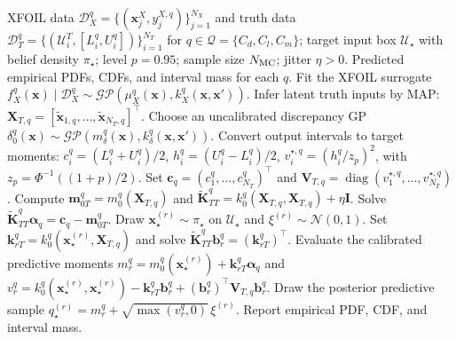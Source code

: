 \documentclass[journal]{new-aiaa}
\begin{document}
\begin{algorithm}[t]
\footnotesize
\caption{Latent input distributional calibration and Monte Carlo propagation}
\label{alg:latent_dc_mc}
\begin{algorithmic}[1]
\Require XFOIL data $\mathcal{D}_X^q= \{ ( \mathbf{x}_{j}^{X},y_{j}^{X,q} ) \}_{j=1}^{N_X}$ and truth data
$\mathcal{D}_T^q=\{(\mathcal{U}_i^T,[L_i^q,U_i^q])\}_{i=1}^{N_T}$ for
$q\in\mathcal{Q}=\{C_d,C_l,C_m\}$; target input box $\mathcal{U}_\star$ with belief density
$\pi_\star$; level $p=0.95$; sample size $N_{\rm MC}$; jitter $\eta>0$.
\Ensure Predicted empirical PDFs, CDFs, and interval mass for each $q$.
    \State Fit the XFOIL surrogate
    $f_X^q(\mathbf{x})\mid\mathcal{D}_X^q\sim
    \mathcal{GP}(\mu_X^q(\mathbf{x}),k_X^q(\mathbf{x},\mathbf{x}'))$.
    \State Infer latent truth inputs by MAP: $\mathbf{X}_{T,q}=[\widetilde{\mathbf{x}}_{1,q},\ldots,
    \widetilde{\mathbf{x}}_{N_T,q}]^\top$.
    \State Choose an uncalibrated discrepancy GP
    $\delta_0^q(\mathbf{x})\sim
    \mathcal{GP}(m_\delta^q(\mathbf{x}),k_\delta^q(\mathbf{x},\mathbf{x}'))$.
    \State Convert output intervals to target moments:
    $c_i^q=(L_i^q+U_i^q)/2$,
    $h_i^q=(U_i^q-L_i^q)/2$,
    $v_i^{\star,q}=(h_i^q/z_p)^2$, with
    $z_p=\Phi^{-1}((1+p)/2)$. Set
    $\mathbf{c}_q=(c_1^q,\ldots,c_{N_T}^q)^\top$ and
    $\mathbf{V}_{T,q}=\operatorname{diag}(v_1^{\star,q},\ldots,v_{N_T}^{\star,q})$.
    \State Compute $\mathbf{m}_{0T}^q=m_0^q(\mathbf{X}_{T,q})$ and
    $\widetilde{\mathbf{K}}_{TT}^q
    =k_0^q(\mathbf{X}_{T,q},\mathbf{X}_{T,q})+\eta\mathbf{I}$.
    Solve
    $\widetilde{\mathbf{K}}_{TT}^q\boldsymbol{\alpha}_q
    =\mathbf{c}_q-\mathbf{m}_{0T}^q$.
        \State Draw $\mathbf{x}_\star^{(r)}\sim\pi_\star$ on $\mathcal{U}_\star$ and
        $\xi^{(r)}\sim\mathcal{N}(0,1)$.
        \State Set $\mathbf{k}_{rT}^q
        =k_0^q(\mathbf{x}_\star^{(r)},\mathbf{X}_{T,q})$ and solve
        $\widetilde{\mathbf{K}}_{TT}^q\mathbf{b}_r^q=(\mathbf{k}_{rT}^q)^\top$.
        \State Evaluate the calibrated predictive moments
        $m_r^q=m_0^q(\mathbf{x}_\star^{(r)})+\mathbf{k}_{rT}^q\boldsymbol{\alpha}_q$ and
        $v_r^q=k_0^q(\mathbf{x}_\star^{(r)},\mathbf{x}_\star^{(r)})
        -\mathbf{k}_{rT}^q\mathbf{b}_r^q
        +(\mathbf{b}_r^q)^\top\mathbf{V}_{T,q}\mathbf{b}_r^q$.
        \State Draw the posterior predictive sample
        $q_\star^{(r)}=m_r^q+\sqrt{\max(v_r^q,0)}\,\xi^{(r)}$.
    \EndFor
    \State Report empirical PDF, CDF, and interval mass.
\EndFor
\end{algorithmic}
\end{algorithm}
\end{document}
